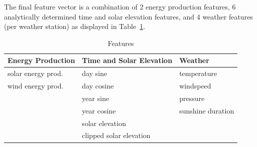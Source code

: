 \documentclass[11pt,table]{article}
\begin{document}
The final feature vector is a combination of 2 energy production features, 6 analytically determined time and solar elevation features, and 4 weather features (per weather station) as displayed in Table~\ref{tab:features}.

\begin{table}[H]
\begin{center}
\begin{tabular}{p{4.5cm} p{5cm} p{4.5cm}}
\toprule
\textbf{Energy Production} & \textbf{Time and Solar Elevation} & \textbf{Weather}              \\
\midrule
solar energy prod. & day sine                 & temperature          \\
wind energy prod.  & day cosine               & windspeed            \\
                   & year sine                & pressure             \\
                   & year cosine              & sunshine duration    \\
                   & solar elevation          &                      \\
                   & clipped solar elevation  &                     \\ \bottomrule
\end{tabular}
\end{center}
\caption{Features}
\label{tab:features}
\end{table}
\end{document}
